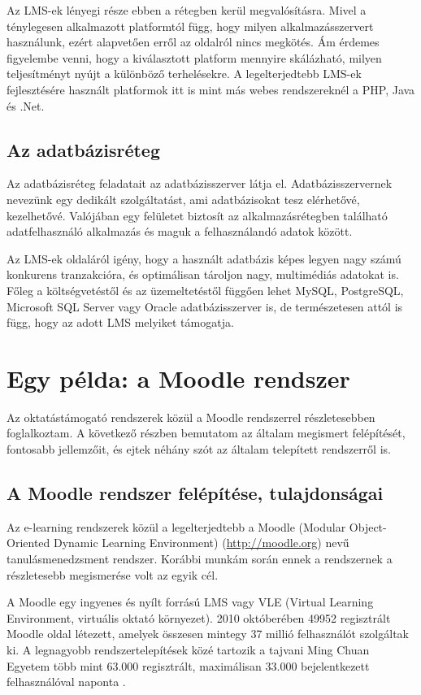 Az LMS-ek lényegi része ebben a rétegben kerül megvalósításra. Mivel a ténylegesen alkalmazott platformtól függ, hogy milyen alkalmazásszervert használunk, ezért alapvetően erről az oldalról nincs megkötés. Ám érdemes figyelembe venni, hogy a kiválasztott platform mennyire skálázható, milyen teljesítményt nyújt a különböző terhelésekre. A legelterjedtebb LMS-ek fejlesztésére használt platformok itt is mint más webes rendszereknél a PHP, Java és .Net.

\subsection{Az adatbázisréteg}
Az adatbázisréteg feladatait az adatbázisszerver látja el. Adatbázisszervernek nevezünk egy dedikált szolgáltatást, ami adatbázisokat tesz elérhetővé, kezelhetővé. Valójában egy felületet biztosít az alkalmazásrétegben található adatfelhasználó alkalmazás és maguk a felhasználandó adatok között.

Az LMS-ek oldaláról igény, hogy a használt adatbázis képes legyen nagy számú konkurens tranzakcióra, és optimálisan tároljon nagy, multimédiás adatokat is. Főleg a költségvetéstől és az üzemeltetéstől függően lehet MySQL, PostgreSQL, Microsoft SQL Server vagy Oracle adatbázisszerver is, de természetesen attól is függ, hogy az adott LMS melyiket támogatja. 

\section{Egy példa: a Moodle rendszer}
Az oktatástámogató rendszerek közül a Moodle rendszerrel részletesebben foglalkoztam. A következő részben bemutatom az általam megismert felépítését, fontosabb jellemzőit, és ejtek néhány szót az általam telepített rendszerről is.

\subsection{A Moodle rendszer felépítése, tulajdonságai}
Az e-learning rendszerek közül a legelterjedtebb a Moodle (Modular Object-Oriented Dynamic Learning Environment) (\href{http://moodle.org}{http://moodle.org}) nevű tanulásmenedzsment rendszer. Korábbi munkám során ennek a rendszernek a részletesebb megismerése volt az egyik cél.

A Moodle  egy ingyenes és nyílt forrású LMS vagy VLE (Virtual Learning Environment, virtuális oktató környezet). 2010 októberében 49952 regisztrált Moodle oldal létezett, amelyek összesen mintegy 37 millió felhasználót szolgáltak ki. A legnagyobb rendszertelepítések közé tartozik a tajvani Ming Chuan Egyetem több mint 63.000 regisztrált, maximálisan 33.000 bejelentkezett felhasználóval naponta \cite{moodleinstplus}.

